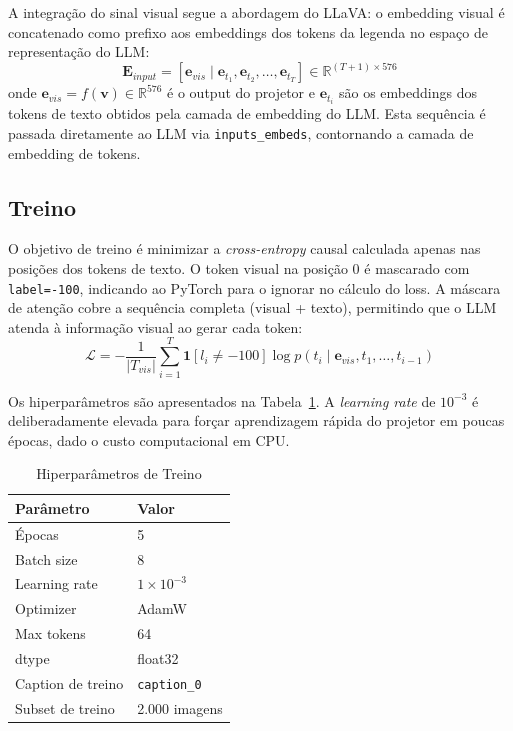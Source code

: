 \documentclass[conference]{IEEEtran}
\begin{document}
A integração do sinal visual segue a abordagem do LLaVA: o embedding visual é concatenado como prefixo aos embeddings dos tokens da legenda no espaço de representação do LLM:
\begin{equation}
    \mathbf{E}_{input} = [\mathbf{e}_{vis} \;|\; \mathbf{e}_{t_1}, \mathbf{e}_{t_2}, \ldots, \mathbf{e}_{t_T}] \in \mathbb{R}^{(T+1) \times 576}
\end{equation}
onde $\mathbf{e}_{vis} = f(\mathbf{v}) \in \mathbb{R}^{576}$ é o output do projetor e $\mathbf{e}_{t_i}$ são os embeddings dos tokens de texto obtidos pela camada de embedding do LLM. Esta sequência é passada diretamente ao LLM via \texttt{inputs\_embeds}, contornando a camada de embedding de tokens.

\subsection{Treino}

O objetivo de treino é minimizar a \textit{cross-entropy} causal calculada apenas nas posições dos tokens de texto. O token visual na posição 0 é mascarado com \texttt{label=-100}, indicando ao PyTorch para o ignorar no cálculo do loss. A máscara de atenção cobre a sequência completa (visual + texto), permitindo que o LLM atenda à informação visual ao gerar cada token:
\begin{equation}
    \mathcal{L} = -\frac{1}{|T_{vis}|} \sum_{i=1}^{T} \mathbf{1}[l_i \neq -100] \log p(t_i \mid \mathbf{e}_{vis}, t_1, \ldots, t_{i-1})
\end{equation}

Os hiperparâmetros são apresentados na Tabela~\ref{tab:hparams}. A \textit{learning rate} de $10^{-3}$ é deliberadamente elevada para forçar aprendizagem rápida do projetor em poucas épocas, dado o custo computacional em CPU.

\begin{table}[htbp]
\caption{Hiperparâmetros de Treino}
\begin{center}
\begin{tabular}{ll}
\toprule
\textbf{Parâmetro} & \textbf{Valor} \\
\midrule
Épocas             & 5 \\
Batch size         & 8 \\
Learning rate      & $1 \times 10^{-3}$ \\
Optimizer          & AdamW \\
Max tokens         & 64 \\
dtype              & float32 \\
Caption de treino  & \texttt{caption\_0} \\
Subset de treino   & 2.000 imagens \\
\bottomrule
\end{tabular}
\label{tab:hparams}
\end{center}
\end{table}
\end{document}
